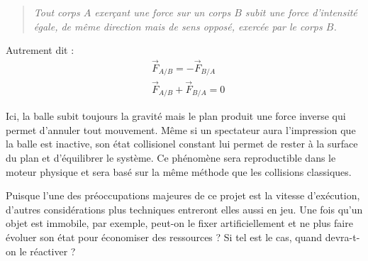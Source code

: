 \begin{quote}
\textit{Tout corps $A$ exerçant une force sur un corps $B$ subit une force
d'intensité égale, de même direction mais de sens opposé, exercée par
le corps $B$.}
\end{quote}

Autrement dit :
\begin{align*}
  &\vec{F}_{A/B} = -\vec{F}_{B/A} \\
  &\vec{F}_{A/B} + \vec{F}_{B/A} = 0
\end{align*}

Ici, la balle subit toujours la gravité mais le plan produit une force
inverse qui permet d'annuler tout mouvement. Même si un spectateur
aura l'impression que la balle est inactive, son état collisionel
constant lui permet de rester à la surface du plan et d'équilibrer le
système. Ce phénomène sera reproductible dans le moteur physique et
sera basé sur la même méthode que les collisions classiques.

Puisque l'une des préoccupations majeures de ce projet est la vitesse
d'exécution, d'autres considérations plus techniques entreront elles
aussi en jeu. Une fois qu'un objet est immobile, par exemple, peut-on
le fixer artificiellement et ne plus faire évoluer son état pour
économiser des ressources ? Si tel est le cas, quand devra-t-on le
réactiver ?
